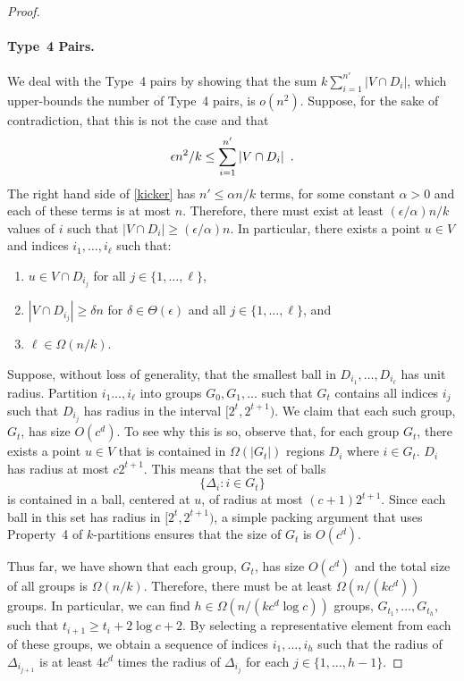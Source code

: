 \documentclass{patmorin}
\begin{document}
\begin{proof}
  \paragraph{Type~4 Pairs.}
  We deal with the Type~4 pairs by showing that the sum
  $k\sum_{i=1}^{n'}|V\cap D_i|$, which upper-bounds the number of Type~4
  pairs, is $o(n^2)$.  Suppose, for the sake of contradiction, that this
  is not the case and that
  \begin{equation}
    \epsilon n^2/k \le \sum_{i=1}^{n'} |V\cap D_i| 
         \enspace . \eqlabel{kicker}
  \end{equation}
  The right hand side of \eqref{kicker} has $n'\le \alpha n/k$
  terms, for some constant $\alpha >0$ and each of these terms
  is at most $n$.  Therefore, there must exist at least
  $(\epsilon/\alpha)n/k$ values of $i$ such that $|V\cap D_i|\ge
  (\epsilon/\alpha)n$.  In particular, there exists a point $u\in V$
  and indices $i_1,\ldots,i_\ell$ such that:
  \begin{enumerate}
     \item $u\in V\cap D_{i_j}$ for all $j\in\{1,\ldots,\ell\}$,
     \item $|V\cap D_{i_j}|\ge \delta n$ for $\delta\in\Theta(\epsilon)$
       and all $j\in\{1,\ldots,\ell\}$, and
     \item $\ell\in\Omega(n/k)$.
  \end{enumerate}

  Suppose, without loss of generality, that the smallest ball
  in $D_{i_1},\ldots,D_{i_\ell}$ has unit radius.  Partition
  $i_1\ldots,i_\ell$ into groups $G_0,G_1,\ldots$ such that $G_t$
  contains all indices $i_j$ such that $D_{i_j}$ has radius in the
  interval $[2^t,2^{t+1})$.
  We claim that each such group, $G_t$, has size $O(c^d)$.  To see
  why this is so, observe that, for each group $G_t$, there exists a
  point $u\in V$ that is contained in $\Omega(|G_t|)$ regions $D_{i}$
  where $i\in G_t$.  $D_{i}$ has radius at most $c2^{t+1}$.  This means
  that the set of balls
  \[
     \{ \Delta_i : i\in G_t\}
  \]
  is contained in a ball, centered at $u$, of radius at most
  $(c+1)2^{t+1}$.  Since each ball in this set has radius in
  $[2^t,2^{t+1})$, a simple packing argument that uses Property~4 of
  $k$-partitions ensures that the size of $G_t$ is $O(c^d)$.

  Thus far, we have shown that each group, $G_t$, has size $O(c^d)$
  and the total size of all groups is $\Omega(n/k)$.
  Therefore, there must be at least $\Omega(n/(kc^d))$ groups.
  In particular, we can find $h\in\Omega(n/(kc^d\log c))$ groups,
  $G_{t_1},\ldots,G_{t_h}$, such that $t_{i+1} \ge
  t_{i}+2\log c+2$.  By selecting a representative element from each
  of these groups, we obtain a sequence of indices $i_1,\ldots,i_h$
  such that the radius of $\Delta_{i_{j+1}}$ is at least $4c^d$ times the
  radius of $\Delta_{i_j}$ for each $j\in\{1,\ldots,h-1\}$.


\end{proof}
\end{document}
